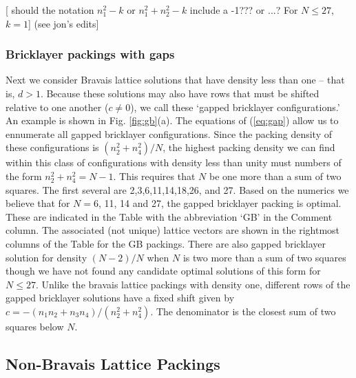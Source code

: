 [ should the notation $n_1^2-k$ or $n_1^2+ n_2^2-k$ include a -1??? or ...? For $N \leq 27$, $k=1$] (see jon's edits]



\subsubsection{Bricklayer packings with gaps}
Next we consider Bravais lattice solutions that have density less than one -- that is, $d>1$.  Because these solutions may also have rows that must be shifted relative to one another ($c\neq 0$), we call these `gapped bricklayer configurations.'  An example is shown in Fig. \ref{fig:gb}(a).  The equations of (\ref{eq:gap}) allow us to ennumerate all gapped bricklayer configurations. Since the packing density of these configurations is $(n_2^2 + n_4^2)/N$, the highest packing density we can find within this class of configurations with density less than unity must numbers of the form $n_2^2 + n_4^2 = N-1$.  This requires that $N$ be one more than a sum of two squares. The first several are 2,3,6,11,14,18,26, and 27.  Based on the numerics we believe that for $N=6$, 11, 14 and 27, the gapped bricklayer packing is optimal. These are indicated in the Table with the abbreviation `GB' in the Comment column. The associated (not unique) lattice vectors are shown in the rightmost columns of the Table for the GB packings.  There are also gapped bricklayer solution for density $(N-2)/N$ when $N$ is two more than a sum of two squares though we have not found any candidate optimal solutions of this form for $N \leq 27$. Unlike the bravais lattice packings with density one, different rows of the gapped bricklayer solutions have a fixed shift given by $c = - (n_1 n_2 + n_3 n_4)/(n_2^2 + n_4^2)$. The denominator is the closest sum of two squares below $N$. 

\subsection{Non-Bravais Lattice Packings}

